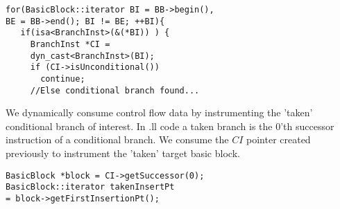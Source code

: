 \begin{frame}[fragile]
\begin{lstlisting}
for(BasicBlock::iterator BI = BB->begin(),
BE = BB->end(); BI != BE; ++BI){
   if(isa<BranchInst>(&(*BI)) ) {
     BranchInst *CI = 
     dyn_cast<BranchInst>(BI);
     if (CI->isUnconditional())
       continue; 
     //Else conditional branch found...
\end{lstlisting}
\end{frame}

We dynamically consume control flow data by instrumenting the 'taken' conditional branch of interest. In .ll code a taken branch is the 0'th successor instruction of a conditional branch. We consume the $CI$ pointer created previously to instrument the 'taken' target basic block.\\

\begin{frame}[fragile]
\begin{lstlisting}
BasicBlock *block = CI->getSuccessor(0);
BasicBlock::iterator takenInsertPt
= block->getFirstInsertionPt();
\end{lstlisting}
\end{frame}
  

